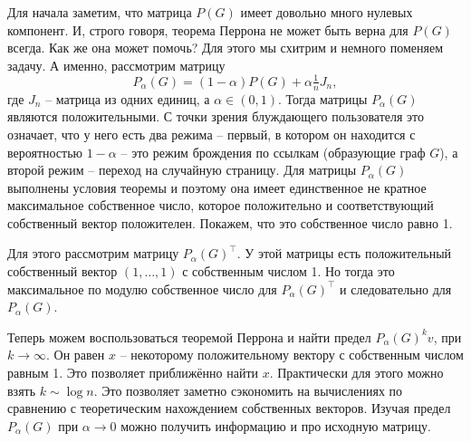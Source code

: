 Для начала заметим, что матрица $P(G)$ имеет довольно много нулевых компонент. И, строго говоря, теорема Перрона не может быть верна для $P(G)$ всегда. Как же она может помочь? Для этого мы схитрим и немного поменяем задачу. А именно, рассмотрим матрицу $$P_{\alpha}(G)=(1-\alpha) P(G) + \alpha\tfrac{1}{n}J_n,$$
где $J_n$ -- матрица из одних единиц, а $\alpha \in (0,1)$. Тогда матрицы $P_{\alpha}(G)$ являются положительными. С точки зрения блуждающего пользователя это означает, что у него есть два режима -- первый, в котором он находится с вероятностью $1-\alpha$ -- это режим брождения по ссылкам (образующие граф $G$), а второй режим -- переход на случайную страницу. Для матрицы $P_{\alpha}(G)$ выполнены условия теоремы и поэтому она имеет единственное не кратное максимальное собственное число, которое положительно и соответствующий собственный вектор положителен. Покажем, что это собственное число равно 1.

Для этого рассмотрим матрицу $P_{\alpha}(G)^{\top}$. У этой матрицы есть положительный собственный вектор $(1,\dots,1)$ с собственным числом 1. Но тогда это максимальное по модулю собственное число для $P_{\alpha}(G)^{\top}$ и следовательно для $P_{\alpha}(G)$. 

Теперь можем воспользоваться теоремой Перрона и найти предел $P_{\alpha}(G)^kv$, при $k \to \infty$. Он равен $x$ -- некоторому положительному вектору с собственным числом равным 1. Это позволяет приближённо найти $x$. Практически для этого можно взять $k\sim \log n$. Это позволяет заметно сэкономить на вычислениях по сравнению с теоретическим нахождением собственных векторов. Изучая предел $P_{\alpha}(G)$ при $\alpha \to 0$ можно получить информацию и про исходную матрицу.

